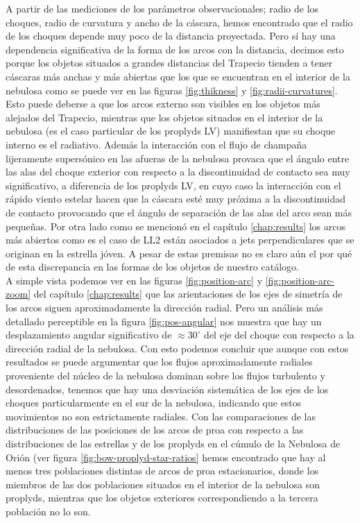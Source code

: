 A partir de las mediciones de los parámetros observacionales; radio de los choques, radio de curvatura y ancho de la cáscara, hemos encontrado que el radio de los choques depende muy poco de la distancia proyectada. Pero sí hay una dependencia significativa de la forma de los arcos con la distancia, decimos esto porque los objetos situados a grandes distancias del Trapecio tienden a tener cáscaras más anchas y más abiertas que los que se encuentran en el interior de la nebulosa como se puede ver en las figuras \ref{fig:thikness} y \ref{fig:radii-curvatures}. Esto puede deberse a que los arcos externo son visibles en los objetos más alejados del Trapecio, mientras que los objetos situados en el interior de la nebulosa (es el caso particular de los proplyds LV) manifiestan que su choque interno es el radiativo. Además la interacción con el flujo de champaña lijeramente supersónico en las afueras de la nebulosa provaca que el ángulo entre las alas del choque exterior con respecto a la discontinuidad de contacto sea muy significativo, a diferencia de los proplyds LV, en cuyo caso la interacción con el rápido viento estelar hacen que la cáscara esté muy próxima a la discontinuidad de contacto provocando que el ángulo de separación de las alas del arco sean más pequeñas. Por otra lado como se mencionó en el capítulo \ref{chap:results} los arcos más abiertos como es el caso de LL2 están asociados a jets perpendiculares que se originan en la estrella jóven. A pesar de estas premisas no es claro aún el por qué de esta discrepancia en las formas de los objetos de nuestro catálogo. \\  


A simple vista podemos ver en las figuras \ref{fig:position-arc} y \ref{fig:position-arc-zoom} del capítulo \ref{chap:results} que las arientaciones de los ejes de simetría de los arcos siguen aproximadamente la dirección radial. Pero un análisis más detallado perceptible en la figura \ref{fig:pos-angular} nos muestra que hay un desplazamiento angular significativo de \(\approx 30^{\circ}\) del eje del choque con respecto a la dirección radial de la nebulosa. Con esto podemos concluir que aunque con estos resultados se puede argumentar que los flujos aproximadamente radiales proveniente del núcleo de la nebulosa dominan sobre los flujos turbulento y desordenados, tenemos que hay una desviación sistemática de los ejes de los choques particularmente en el sur de la nebulosa, indicando que estos movimientos no son estrictamente radiales. Con las comparaciones de las distribuciones de las posiciones de los arcos de proa con respecto a las distribuciones de las estrellas y de los proplyds en el cúmulo de la Nebulosa de Orión (ver figura \ref{fig:bow-proplyd-star-ratios} hemos encontrado que hay al menos tres poblaciones distintas de arcos de proa estacionarios, donde los miembros de las dos poblaciones situados en el interior de la nebulosa son proplyds, mientras que los objetos exteriores correspondiendo a la tercera población no lo son.\\      

